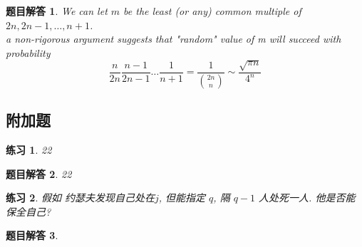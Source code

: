 \documentclass[mode=geye, chinesefont=founder]{elegantnote}
\newtheorem{exercise}{练习}
\newtheorem{answer}{题目解答}
\begin{document}
\begin{answer}
	We can let $ m $ be the least (or any) common multiple of $ 2n, 2n-1, \dots, n+1 $.\\
	a non-rigorous argument suggests that "random" value of m will succeed with probability 
	\begin{equation*}
		\frac{n}{2n} \frac{n-1}{2n-1} \dots \frac{1}{n+1} = \frac{1}{\binom{2n}{n}} \sim \frac{\sqrt{\pi n}}{4^n}
	\end{equation*}
\end{answer}

\subsection{附加题}
\begin{exercise}
	22
\end{exercise}

\begin{answer}
	22
\end{answer}

\begin{exercise}
	假如 约瑟夫发现自己处在$ j $, 但能指定 $ q $,  隔 $ q-1 $  人处死一人. 他是否能保全自己?
\end{exercise}

\begin{answer}
	
\end{answer}
\end{document}
